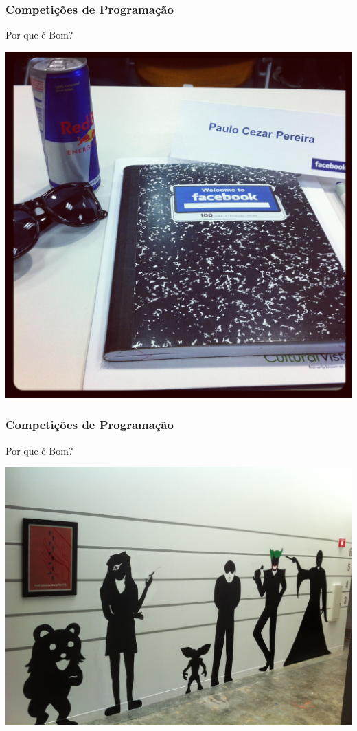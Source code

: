 \begin{frame}
\frametitle{Competições de Programação}
\begin{block}{Por que é Bom?}
\begin{center}
	\includegraphics[height=.7\textheight]{sntc/IMG_1649.JPG}
\end{center}
\end{block}
\end{frame}
\begin{frame}
\frametitle{Competições de Programação}
\begin{block}{Por que é Bom?}
\begin{center}
	\includegraphics[width=.7\textwidth]{sntc/IMG_2040.JPG}
\end{center}
\end{block}
\end{frame}
